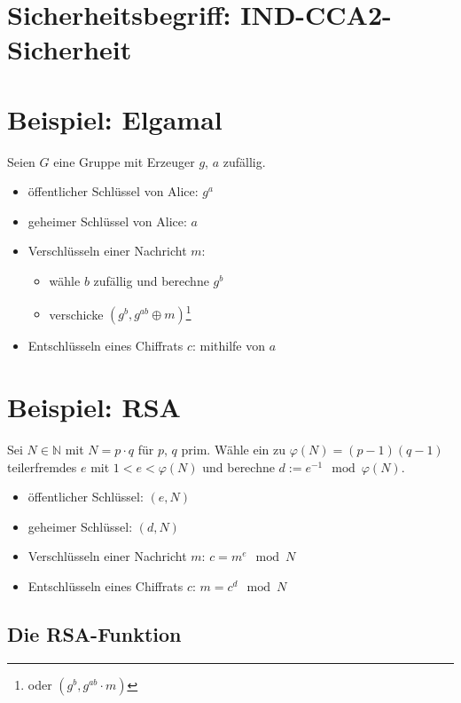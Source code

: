 \documentclass[a4paper,twoside,DIV15,BCOR12mm]{scrbook}
\begin{document}

\section{Sicherheitsbegriff: IND-CCA2-Sicherheit}


\section{Beispiel: Elgamal}

Seien $G$ eine Gruppe mit Erzeuger $g$, $a$ zufällig.

\begin{itemize}
	\item öffentlicher Schlüssel von Alice: $g^a$
	\item geheimer Schlüssel von Alice: $a$
	\item Verschlüsseln einer Nachricht $m$: 
		\begin{itemize}
			\item wähle $b$ zufällig und berechne $g^b$
			\item verschicke $(g^b, g^{ab} \oplus m)$\footnote{oder $(g^b, g^{ab} \cdot m)$}
		\end{itemize}
	\item Entschlüsseln eines Chiffrats $c$: mithilfe von $a$
\end{itemize}

\section{Beispiel: RSA}

Sei $N \in \mathbb{N}$ mit $N = p \cdot q$ für $p$, $q$ prim. Wähle ein zu $\varphi(N) = (p-1)(q-1)$ teilerfremdes $e$ mit $1 < e < \varphi(N)$ und berechne $d := e^{-1} \mod \varphi(N)$.

\begin{itemize}
	\item öffentlicher Schlüssel: $(e, N)$
	\item geheimer Schlüssel: $(d, N)$
	\item Verschlüsseln einer Nachricht $m$: $c = m^e \mod N$
	\item Entschlüsseln eines Chiffrats $c$: $m = c^d \mod N$
\end{itemize}

\subsection{Die RSA-Funktion}
\end{document}
